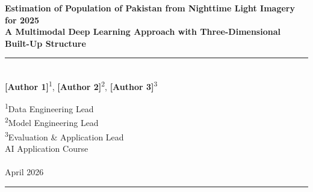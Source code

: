 \documentclass[12pt,a4paper]{article}
\begin{document}
\begin{titlepage}
    \centering
    \vspace*{2cm}
    
    {\Huge\bfseries Estimation of Population of Pakistan from Nighttime Light Imagery for 2025\\[0.3cm]}
    {\LARGE\bfseries A Multimodal Deep Learning Approach with Three-Dimensional Built-Up Structure\\[1.5cm]}
    
    \rule{\textwidth}{1.5pt}\\[0.5cm]
    
    {\Large\textbf{[Author 1]}\textsuperscript{1}, \textbf{[Author 2]}\textsuperscript{2}, \textbf{[Author 3]}\textsuperscript{3}\\[0.3cm]}
    
    \textsuperscript{1}Data Engineering Lead\\
    \textsuperscript{2}Model Engineering Lead\\
    \textsuperscript{3}Evaluation \& Application Lead\\[0.5cm]
    
    {\large AI Application Course\\
    [University Name]\\
    April 2026\\[1cm]}
    
    \rule{\textwidth}{1.5pt}\\[1cm]
    
    \begin{abstract}
    \noindent
    Accurate gridded population maps are essential for disaster response, urban planning, and resource allocation, yet traditional censuses are expensive and infrequently updated. Satellite-derived nighttime light (NTL) imagery offers a scalable proxy for human settlement density, but conventional approaches suffer from rural underprediction and urban saturation. This study introduces a four-channel multimodal deep learning architecture that fuses 72 months (2020--2025) of VIIRS NTL composites from Google Earth Engine with WorldPop 2025 population proxies, GHSL built-up surface, and critically, GHSL built-up volume as a three-dimensional structural cue. Using a shared ResNet-18 encoder with one-dimensional temporal convolution and Huber loss, our best model achieves Pearson $R = 0.881$ on 500-metre grid cells across Pakistan, with MAE of 2.24 people per pixel and scale factor 1.012. An ablation study across seven model variants and numerous failed experiments reveals that ImageNet pretraining provides a +0.125 boost in correlation, while building volume alone degrades performance ($R = 0.612$) but creates synergistic gains when paired with surface context ($R = 0.881$). This work was developed with extensive assistance from the Kimi AI coding agent for data processing, model training, debugging, and pipeline automation. All code, models, and an interactive Streamlit application are open-sourced.
    \end{abstract}
    

\end{titlepage}
\end{document}
